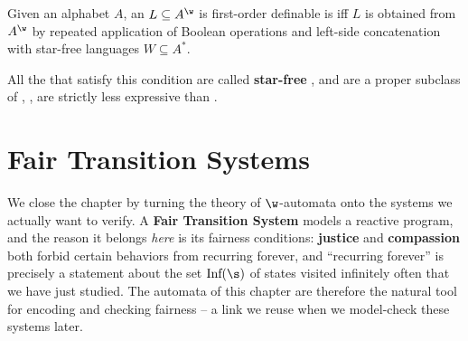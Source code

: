 \documentclass[oneside]{academica}
\begin{document}
\begin{proof*}
\end{proof*}

\begin{theorem*}[Ladner]
  Given an alphabet $A$, an \wlan $L \subseteq \Aw$ is first-order definable is \SA iff $L$ is obtained from $\Aw$ by repeated application of Boolean operations and left-side concatenation with star-free languages $W \subseteq A^*$.

  \bigskip
  All the \wlans that satisfy this condition are called \textbf{star-free \wlans}, and are a proper subclass of \wlans, \ie, are strictly less expressive than \wlans.
\end{theorem*}

\section{Fair Transition Systems}

We close the chapter by turning the theory of $\w$-automata onto the systems we actually want to verify. A \textbf{Fair Transition System} models a reactive program, and the reason it belongs \emph{here} is its fairness conditions: \textbf{justice} and \textbf{compassion} both forbid certain behaviors from recurring forever, and ``recurring forever'' is precisely a statement about the set $\inf{\s}$ of states visited infinitely often that we have just studied. The \Buchi automata of this chapter are therefore the natural tool for encoding and checking fairness -- a link we reuse when we model-check these systems later.
\end{document}
